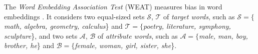 \documentclass{article}
\begin{document}



The \textit{Word Embedding Association Test} (WEAT) measures bias in word embeddings \cite{WEAT}.
It considers two equal-sized sets $\mathcal{S}$, $\mathcal{T}$ of \textit{target words}, such as $\mathcal{S}=\{$\textit{math, algebra, geometry, calculus}\} and $\mathcal{T}=\{$\textit{poetry, literature, symphony, sculpture}\}, and two sets $\mathcal{A}$, $\mathcal{B}$ of \textit{attribute words}, such as $\mathcal{A}=\{$\textit{male, man, boy, brother, he}\} and $\mathcal{B}=\{$\textit{female, woman, girl, sister, she}\}.
\end{document}
